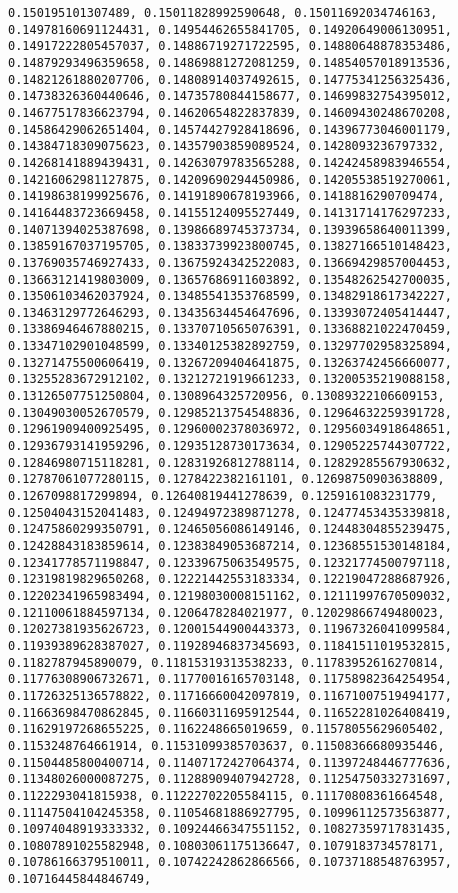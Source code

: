 \documentclass[11pt]{article}
\begin{document}
\begin{Verbatim}[commandchars=\\\{\}]
0.150195101307489, 0.15011828992590648, 0.15011692034746163, 0.14978160691124431, 0.14954462655841705, 0.14920649006130951, 0.14917222805457037, 0.14886719271722595, 0.14880648878353486, 0.14879293496359658, 0.14869881272081259, 0.14854057018913536, 0.14821261880207706, 0.14808914037492615, 0.14775341256325436, 0.14738326360440646, 0.14735780844158677, 0.14699832754395012, 0.14677517836623794, 0.14620654822837839, 0.14609430248670208, 0.14586429062651404, 0.14574427928418696, 0.14396773046001179, 0.14384718309075623, 0.14357903859089524, 0.1428093236797332, 0.14268141889439431, 0.14263079783565288, 0.14242458983946554, 0.14216062981127875, 0.14209690294450986, 0.14205538519270061, 0.14198638199925676, 0.14191890678193966, 0.1418816290709474, 0.14164483723669458, 0.14155124095527449, 0.14131714176297233, 0.14071394025387698, 0.13986689745373734, 0.13939658640011399, 0.13859167037195705, 0.13833739923800745, 0.13827166510148423, 0.13769035746927433, 0.13675924342522083, 0.13669429857004453, 0.13663121419803009, 0.13657686911603892, 0.13548262542700035, 0.13506103462037924, 0.13485541353768599, 0.13482918617342227, 0.13463129772646293, 0.13435634454647696, 0.13393072405414447, 0.13386946467880215, 0.13370710565076391, 0.13368821022470459, 0.13347102901048599, 0.13340125382892759, 0.13297702958325894, 0.13271475500606419, 0.13267209404641875, 0.13263742456660077, 0.13255283672912102, 0.13212721919661233, 0.13200535219088158, 0.13126507751250804, 0.1308964325720956, 0.13089322106609153, 0.13049030052670579, 0.12985213754548836, 0.12964632259391728, 0.12961909400925495, 0.12960002378036972, 0.12956034918648651, 0.12936793141959296, 0.12935128730173634, 0.12905225744307722, 0.12846980715118281, 0.12831926812788114, 0.12829285567930632, 0.12787061077280115, 0.1278422382161101, 0.12698750903638809, 0.1267098817299894, 0.12640819441278639, 0.1259161083231779, 0.12504043152041483, 0.12494972389871278, 0.12477453435339818, 0.12475860299350791, 0.12465056086149146, 0.12448304855239475, 0.12428843183859614, 0.12383849053687214, 0.12368551530148184, 0.12341778571198847, 0.12339675063549575, 0.12321774500797118, 0.12319819829650268, 0.12221442553183334, 0.12219047288687926, 0.12202341965983494, 0.12198030008151162, 0.12111997670509032, 0.12110061884597134, 0.1206478284021977, 0.12029866749480023, 0.12027381935626723, 0.12001544900443373, 0.11967326041099584, 0.11939389628387027, 0.11928946837345693, 0.11841511019532815, 0.1182787945890079, 0.11815319313538233, 0.11783952616270814, 0.11776308906732671, 0.11770016165703148, 0.11758982364254954, 0.11726325136578822, 0.11716660042097819, 0.11671007519494177, 0.11663698470862845, 0.11660311695912544, 0.11652281026408419, 0.11629197268655225, 0.1162248665019659, 0.11578055629605402, 0.1153248764661914, 0.11531099385703637, 0.11508366680935446, 0.11504485800400714, 0.11407172427064374, 0.11397248446777636, 0.11348026000087275, 0.11288909407942728, 0.11254750332731697, 0.1122293041815938, 0.11222702205584115, 0.11170808361664548, 0.11147504104245358, 0.11054681886927795, 0.10996112573563877, 0.10974048919333332, 0.10924466347551152, 0.10827359717831435, 0.10807891025582948, 0.10803061175136647, 0.1079183734578171, 0.10786166379510011, 0.10742242862866566, 0.10737188548763957, 0.10716445844846749, 
\end{Verbatim}
\end{document}
